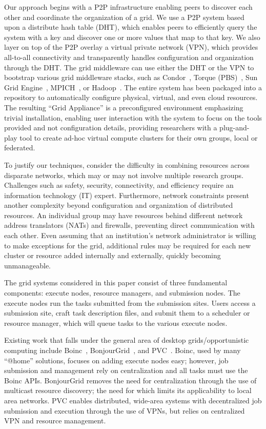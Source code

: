 \documentclass[conference]{IEEEtran}
\begin{document}
Our approach begins with a P2P infrastructure enabling peers to discover each
other and coordinate the organization of a grid.  We use a P2P system based
upon a distribute hash table (DHT), which enables peers to efficiently query
the system with a key and discover one or more values that map to that key.  We
also layer on top of the P2P overlay a virtual private network (VPN), which
provides all-to-all connectivity and transparently handles configuration and
organization through the DHT.  The grid middleware can use either the DHT or
the VPN to bootstrap various grid middleware stacks, such as
Condor~\cite{condor}, Torque (PBS)~\cite{torque}, Sun Grid Engine~\cite{sge},
MPICH~\cite{mpich}, or Hadoop~\cite{hadoop}.  The entire system has been
packaged into a repository to automatically configure physical, virtual, and
even cloud resources.  The resulting ``Grid Appliance'' is a preconfigured
environment emphasizing trivial installation, enabling user interaction with
the system to focus on the tools provided and not configuration details,
providing researchers with a plug-and-play tool to create ad-hoc virtual
compute clusters for their own groups, local or federated.

To justify our techniques, consider the difficulty in combining resources
across disparate networks, which may or may not involve multiple research
groups.  Challenges such as safety, security, connectivity, and efficiency
require an information technology (IT) expert.  Furthermore, network
constraints present another complexity beyond configuration and organization of
distributed resources.  An individual group may have resources behind different
network address translators (NATs) and firewalls, preventing direct
communication with each other.  Even assuming that an institution's network
administrator is willing to make exceptions for the grid, additional rules may
be required for each new cluster or resource added internally and externally,
quickly becoming unmanageable.

The grid systems considered in this paper consist of three fundamental
components:  execute nodes, resource managers, and submission nodes.  The
execute nodes run the tasks submitted from the submission sites.  Users access
a submission site, craft task description files, and submit them to a scheduler
or resource manager, which will queue tasks to the various execute nodes.

Existing work that falls under the general area of desktop grids/opportunistic
computing include Boinc~\cite{boinc}, BonjourGrid~\cite{bonjourgrid}, and
PVC~\cite{pvc}.  Boinc, used by many ``@home'' solutions, focuses on adding
execute nodes easy; however, job submission and management rely on
centralization and all tasks must use the Boinc APIs.  BonjourGrid removes the
need for centralization through the use of multicast resource discovery; the
need for which limits its applicability to local area networks.  PVC enables
distributed, wide-area systems with decentralized job submission and execution
through the use of VPNs, but relies on centralized VPN and resource management.
\end{document}
